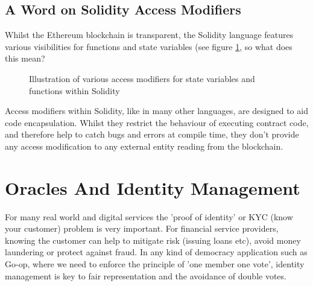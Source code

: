 \subsection{A Word on Solidity Access Modifiers}
Whilst the Ethereum blockchain is transparent, the Solidity language features various visibilities for functions and state variables (see figure \ref{fig:AccessModifiers}, so what does this mean? \\
\begin{figure}
\centering
{}
\decoRule
\caption[Solidity Access Modifiers]{Illustration of various access modifiers for state variables and functions within Solidity}
\label{fig:AccessModifiers}
\end{figure}
Access modifiers within Solidity, like in many other languages, are designed to aid code encapsulation. Whilst they restrict the behaviour of executing contract code, and therefore help to catch bugs and errors at compile time, they don't provide any access modification to any external entity reading from the blockchain.\\

\section{Oracles And Identity Management}
\label{sec:identity}
For many real world and digital services the 'proof of identity' or KYC (know your customer) problem is very important. For financial service providers, knowing the customer can help to mitigate risk (issuing loans etc), avoid money laundering or protect against fraud. In any kind of democracy application such as Go-op, where we need to enforce the principle of 'one member one vote', identity management is key to fair representation and the avoidance of double votes.\\

